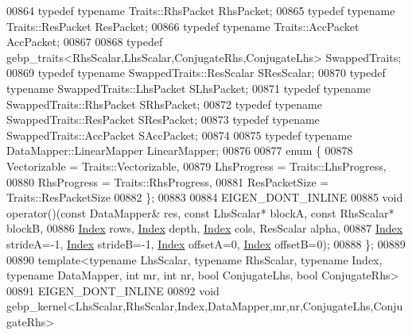 \begin{DoxyCode}
00864   \textcolor{keyword}{typedef} \textcolor{keyword}{typename} Traits::RhsPacket RhsPacket;
00865   \textcolor{keyword}{typedef} \textcolor{keyword}{typename} Traits::ResPacket ResPacket;
00866   \textcolor{keyword}{typedef} \textcolor{keyword}{typename} Traits::AccPacket AccPacket;
00867 
00868   \textcolor{keyword}{typedef} gebp\_traits<RhsScalar,LhsScalar,ConjugateRhs,ConjugateLhs> SwappedTraits;
00869   \textcolor{keyword}{typedef} \textcolor{keyword}{typename} SwappedTraits::ResScalar SResScalar;
00870   \textcolor{keyword}{typedef} \textcolor{keyword}{typename} SwappedTraits::LhsPacket SLhsPacket;
00871   \textcolor{keyword}{typedef} \textcolor{keyword}{typename} SwappedTraits::RhsPacket SRhsPacket;
00872   \textcolor{keyword}{typedef} \textcolor{keyword}{typename} SwappedTraits::ResPacket SResPacket;
00873   \textcolor{keyword}{typedef} \textcolor{keyword}{typename} SwappedTraits::AccPacket SAccPacket;
00874 
00875   \textcolor{keyword}{typedef} \textcolor{keyword}{typename} DataMapper::LinearMapper LinearMapper;
00876 
00877   \textcolor{keyword}{enum} \{
00878     Vectorizable  = Traits::Vectorizable,
00879     LhsProgress   = Traits::LhsProgress,
00880     RhsProgress   = Traits::RhsProgress,
00881     ResPacketSize = Traits::ResPacketSize
00882   \};
00883 
00884   EIGEN\_DONT\_INLINE
00885   \textcolor{keywordtype}{void} operator()(\textcolor{keyword}{const} DataMapper& res, \textcolor{keyword}{const} LhsScalar* blockA, \textcolor{keyword}{const} RhsScalar* blockB,
00886                   \hyperlink{namespace_eigen_a62e77e0933482dafde8fe197d9a2cfde}{Index} rows, \hyperlink{namespace_eigen_a62e77e0933482dafde8fe197d9a2cfde}{Index} depth, \hyperlink{namespace_eigen_a62e77e0933482dafde8fe197d9a2cfde}{Index} cols, ResScalar alpha,
00887                   \hyperlink{namespace_eigen_a62e77e0933482dafde8fe197d9a2cfde}{Index} strideA=-1, \hyperlink{namespace_eigen_a62e77e0933482dafde8fe197d9a2cfde}{Index} strideB=-1, \hyperlink{namespace_eigen_a62e77e0933482dafde8fe197d9a2cfde}{Index} offsetA=0, 
      \hyperlink{namespace_eigen_a62e77e0933482dafde8fe197d9a2cfde}{Index} offsetB=0);
00888 \};
00889 
00890 \textcolor{keyword}{template}<\textcolor{keyword}{typename} LhsScalar, \textcolor{keyword}{typename} RhsScalar, \textcolor{keyword}{typename} Index, \textcolor{keyword}{typename} DataMapper, \textcolor{keywordtype}{int} mr, \textcolor{keywordtype}{int} nr, \textcolor{keywordtype}{bool} 
      ConjugateLhs, \textcolor{keywordtype}{bool} ConjugateRhs>
00891 EIGEN\_DONT\_INLINE
00892 \textcolor{keywordtype}{void} gebp\_kernel<LhsScalar,RhsScalar,Index,DataMapper,mr,nr,ConjugateLhs,ConjugateRhs>

\end{DoxyCode}
